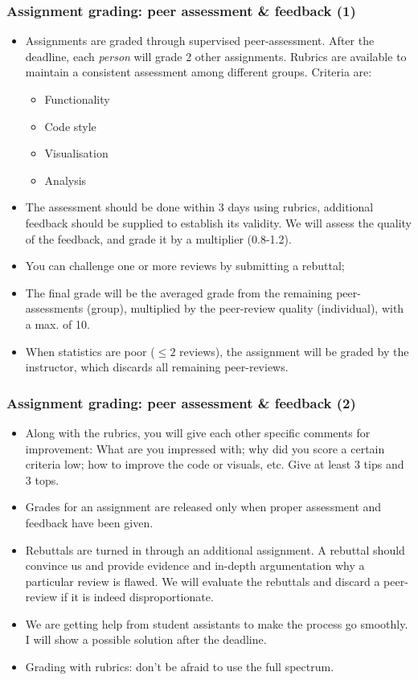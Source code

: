 \begin{frame}
  \frametitle{Assignment grading: peer assessment \& feedback (1)}
  \begin{itemize}
    \item Assignments are graded through supervised peer-assessment. After the deadline, each \emph{person} will grade 2 other assignments. Rubrics are available to maintain a consistent assessment among different groups. Criteria are:
      \begin{itemize}
        \item Functionality
        \item Code style
        \item Visualisation
        \item Analysis
      \end{itemize}
    \item The assessment should be done within 3 days using rubrics, additional feedback should be supplied to establish its validity. We will assess the quality of the feedback, and grade it by a multiplier (0.8-1.2).
    \item You can challenge one or more reviews by submitting a rebuttal; 
    \item The final grade will be the averaged grade from the remaining peer-assessments (group), multiplied by the peer-review quality (individual), with a max. of 10.
    \item When statistics are poor ($\leq 2$ reviews), the assignment will be graded by the instructor, which discards all remaining peer-reviews.
  \end{itemize}
\end{frame}

\begin{frame}
\frametitle{Assignment grading: peer assessment \& feedback (2)}
\begin{itemize}
  \item Along with the rubrics, you will give each other specific comments for improvement: What are you impressed with; why did you score a certain criteria low; how to improve the code or  visuals, etc. Give at least 3 tips and 3 tops.
  \item Grades for an assignment are released only when proper assessment and feedback have been given.
  \item Rebuttals are turned in through an additional assignment. A rebuttal should convince us and provide evidence and in-depth argumentation why a particular review is flawed. We will evaluate the rebuttals and discard a peer-review if it is indeed disproportionate.
  \item We are getting help from student assistants to make the process go smoothly. I will show a possible solution after the deadline.
  \item Grading with rubrics: don't be afraid to use the full spectrum.
\end{itemize}

\end{frame}

